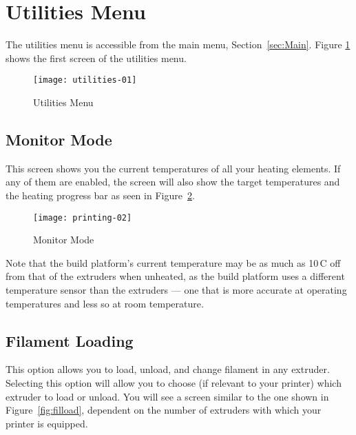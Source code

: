 \section{Utilities Menu}\label{sec:utilities}

The utilities menu is accessible from the main menu, Section~\ref{sec:Main}.  Figure \ref{fig:utilitiesfirstscreen} shows the first screen of the utilities menu.

\begin{figure}[!htbp]
  \centering
    \texttt{[image: utilities-01]}
    \caption{Utilities Menu}
  \label{fig:utilitiesfirstscreen}
\end{figure}


\subsection{Monitor Mode} \label{sec:monmode}

This screen shows you the current temperatures of all your heating elements.  If any of them are enabled, the screen will also show the target temperatures and the heating progress bar as seen in Figure~\ref{fig:heatmonmode}.

\begin{figure}[!htbp]
  \centering
    \texttt{[image: printing-02]}
    \caption{Monitor Mode}
  \label{fig:heatmonmode}
\end{figure}

Note that the build platform's current temperature may be as much as 10\textdegree\,C off from that of the extruders when unheated, as the build platform uses a different temperature sensor than the extruders --- one that is more accurate at operating temperatures and less so at room temperature.


\subsection{Filament Loading} \label{sec:filload}

This option allows you to load, unload, and change filament in any extruder.  Selecting this option will allow you to choose (if relevant to your printer) which extruder to load or unload.  You will see a screen similar to the one shown in Figure~\ref{fig:filload}, dependent on the number of extruders with which your printer is equipped.

